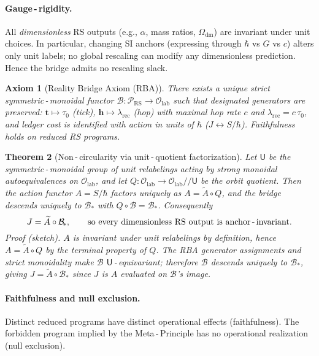 \documentclass[11pt]{article}
\newtheorem{theorem}{Theorem}[section]
\newtheorem{axiom}[theorem]{Axiom}
\theoremstyle{remark}
\begin{document}
\paragraph{Gauge\,\mbox{-}\,rigidity.}
All \emph{dimensionless} RS outputs (e.g., $\alpha$, mass ratios, $\Omega_{\mathrm{dm}}$) are invariant under unit choices.
In particular, changing SI anchors (expressing through $\hbar$ vs $G$ vs $c$) alters only unit labels; no global rescaling can modify any dimensionless prediction. Hence the bridge admits no rescaling slack.

\begin{axiom}[Reality Bridge Axiom (RBA)]
There exists a \emph{unique} strict symmetric\,\mbox{-}\,monoidal functor
$\mathcal B:\mathcal P_{\mathrm{RS}}\!\to\!\mathcal O_{\mathrm{lab}}$
such that designated generators are preserved:
$\mathbf t\mapsto \tau_{0}$ (tick), $\mathbf h\mapsto \lambda_{\mathrm{rec}}$ (hop) with maximal hop rate $c$ and $\lambda_{\mathrm{rec}}=c\,\tau_{0}$, and ledger cost is identified with action in units of $\hbar$ ($J\leftrightarrow S/\hbar$). Faithfulness holds on reduced RS programs.
\end{axiom}

\begin{theorem}[Non\,\mbox{-}\,circularity via unit\,\mbox{-}\,quotient factorization]
Let $\mathsf U$ be the symmetric\,\mbox{-}\,monoidal group of unit relabelings acting by strong monoidal autoequivalences on $\mathcal O_{\mathrm{lab}}$, and let $Q:\mathcal O_{\mathrm{lab}}\!\to\!\mathcal O_{\mathrm{lab}}/\!/\mathsf U$ be the orbit quotient. Then the action functor $A=S/\hbar$ factors uniquely as $A=\widetilde A\circ Q$, and the bridge descends uniquely to $\mathcal B_{\!*}$ with $Q\circ \mathcal B=\mathcal B_{\!*}$. Consequently
\[
J=\widetilde A\circ \mathcal B_{\!*},\qquad
\text{so every dimensionless RS output is anchor\,\mbox{-}\,invariant.}
\]
\emph{Proof (sketch).}
$A$ is invariant under unit relabelings by definition, hence $A=\widetilde A\circ Q$ by the terminal property of $Q$. The RBA generator assignments and strict monoidality make $\mathcal B$ $\mathsf U$\,\mbox{-}\,equivariant; therefore $\mathcal B$ descends uniquely to $\mathcal B_{\!*}$, giving $J=\widetilde A\circ \mathcal B_{\!*}$ since $J$ is $A$ evaluated on $\mathcal B$’s image. \qedhere
\end{theorem}

\paragraph{Faithfulness and null exclusion.}
Distinct reduced programs have distinct operational effects (faithfulness). The forbidden program implied by the Meta\,\mbox{-}\,Principle has no operational realization (null exclusion).
\end{document}
